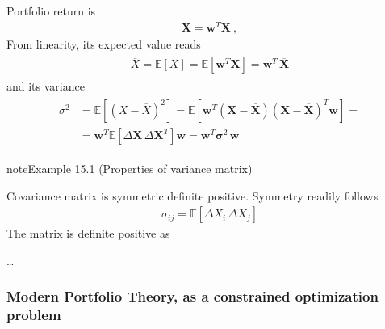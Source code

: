 \documentclass[letterpaper,10pt,english]{jupyterBook}
\begin{document}
\sphinxAtStartPar
Portfolio return is
\begin{equation*}
\begin{split}\mathbf{X} = \mathbf{w}^T \mathbf{X} \ ,\end{split}
\end{equation*}
\sphinxAtStartPar
From linearity, its expected value reads
\begin{equation*}
\begin{split}\begin{aligned}
  \overline{X} = \mathbb{E} \left[ X \right] =  \mathbb{E} \left[ \mathbf{w}^T \mathbf{X} \right] = \mathbf{w}^T \, \overline{\mathbf{X}} 
\end{aligned}\end{split}
\end{equation*}
\sphinxAtStartPar
and its variance
\begin{equation*}
\begin{split}\begin{aligned}
  \sigma^2
  & = \mathbb{E} \left[ (X-\overline{X})^2 \right]      
    = \mathbb{E} \left[ \mathbf{w}^T \left( \mathbf{X} - \overline{\mathbf{X}} \right)\left( \mathbf{X} - \overline{\mathbf{X}} \right)^T \mathbf{w}  \right] = \\
  & = \mathbf{w}^T \mathbb{E} \left[ \Delta \mathbf{X} \, \Delta \mathbf{X}^T \right] \mathbf{w}
    = \mathbf{w}^T \boldsymbol{\sigma}^2 \, \mathbf{w}
\end{aligned}\end{split}
\end{equation*}\label{ch/investing/mpt:example-0}
\begin{sphinxadmonition}{note}{Example 15.1 (Properties of variance matrix)}



\sphinxAtStartPar
Covariance matrix is symmetric definite positive. Symmetry readily follows
\begin{equation*}
\begin{split}\sigma_{ij} = \mathbb{E}\left[ \Delta X_i \, \Delta X_j \right]\end{split}
\end{equation*}
\sphinxAtStartPar
The matrix is definite positive as

\sphinxAtStartPar
…
\end{sphinxadmonition}
\subsubsection*{Modern Portfolio Theory, as a constrained optimization problem}
\end{document}
